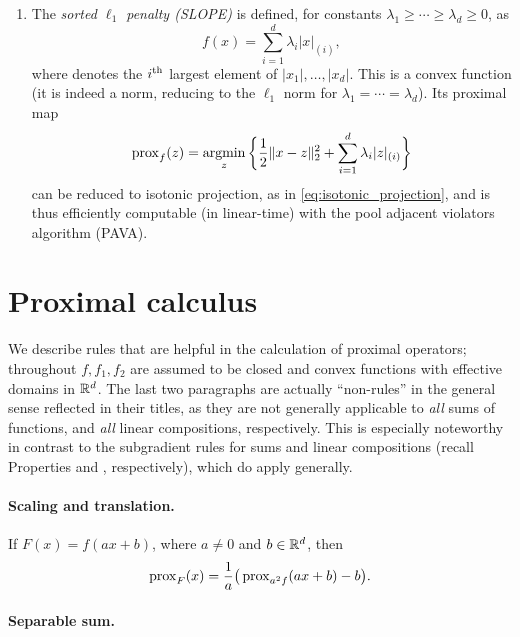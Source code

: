 \begin{Example}
\begin{enumerate}[label=\alph*., ref=\alph*]
\item {}
  The \emph{sorted $\ell_1$ penalty (SLOPE)} is defined, for constants
  $\lambda_1 \geq \cdots \geq \lambda_d \geq 0$, as 
  \begin{equation}
  \label{eq:slope}
  f(x) = \sum_{i=1}^d \lambda_i |x|_{(i)},
  \end{equation}
  where  denotes the $i^{\textnormal{th}}$ largest element of $|x_1|,
  \ldots, |x_d|$. This is a convex function (it is indeed a norm, reducing to
  the $\ell_1$ norm for $\lambda_1 = \cdots = \lambda_d$). Its proximal map   
  \[
  \operatorname{prox}_f(z) = \operatorname*{argmin}_z \bigg\{ \frac{1}{2} \|x - z\|_2^2 +
  \sum_{i=1}^d \lambda_i |z|_{(i)} \bigg\}
  \]
  can be reduced to isotonic projection, as in \eqref{eq:isotonic_projection},
  and is thus efficiently computable (in linear-time) with the pool adjacent
  violators algorithm (PAVA). 
\end{enumerate}
\end{Example}

\section{Proximal calculus}

We describe rules that are helpful in the calculation of proximal operators; 
throughout $f,f_1,f_2$ are assumed to be closed and convex functions with
effective domains in $\mathbb{R}^d$. The last two paragraphs are actually ``non-rules''
in the general sense reflected in their titles, as they are not generally
applicable to \emph{all} sums of functions, and \emph{all} linear compositions, 
respectively. This is especially noteworthy in contrast to the subgradient rules
for sums and linear compositions (recall Properties  
and , respectively), which do apply generally.

\paragraph{Scaling and translation.}

If $F(x) = f(ax + b)$, where $a \not= 0$ and $b \in \mathbb{R}^d$, then 
\[ 
\operatorname{prox}_F(x) = \frac{1}{a} \big( \operatorname{prox}_{a^2 f}(ax + b) - b \big).
\]

\paragraph{Separable sum.}

